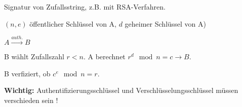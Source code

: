  Signatur von Zufallsstring, z.B. mit RSA-Verfahren. 

  $(n,e)$ öffentlicher Schlüssel von A, $d$ geheimer Schlüssel von A)

  $A \overset{auth.}{\rightarrow} B$

  B wählt Zufallszahl $r < n$. A berechnet $r^d \mod n = c \rightarrow B$.

  B verfiziert, ob $c^e \mod n = r$.

  \par \medskip

  \par \medskip

  \textbf{Wichtig:} Authentifizierungsschlüssel und Verschlüsselungsschlüssel müssen verschieden sein !